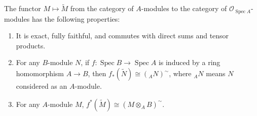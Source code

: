 The functor $M \mapsto \widetilde{M}$ from the category of $A$-modules to the category of $\mathcal{O}_{\operatorname{Spec} A}$-modules has the following properties:
\begin{enumerate}
  \item It is exact, fully faithful, and commutes with direct sums and tensor products.
  \item For any $B$-module $N$, if $f: \operatorname{Spec} B \to \operatorname{Spec} A$ is induced by a ring homomorphism $A \to B$, then $f_*(\widetilde{N}) \cong ({}_{A}N)^{\sim}$, where ${}_{A}N$ means $N$ considered as an $A$-module.
  \item For any $A$-module $M$, $f^*(\widetilde{M}) \cong (M \otimes_A B)^{\sim}$.
\end{enumerate}
